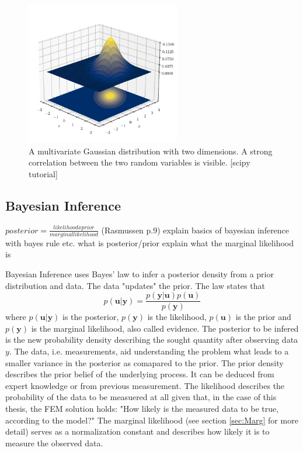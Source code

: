 \documentclass[%
  a4paper,oneside,%
  11pt,%
  smallchapters,
  green,%
  rgb, <cmyk>
  ]{tubsbook}
\begin{document}
\begin{figure}[h]
\begin{center}
\includegraphics[width=0.6\textwidth]{pics/Gaussians}
\caption{A multivariate Gaussian distribution with two dimensions. A strong correlation between the two random variables is visible. [scipy tutorial] }
\label{fig:MultiGauss}
\end{center}
\end{figure}

\subsection{Bayesian Inference}
$posterior = \frac{likelihood x prior}{marginal likelihood}$ (Rasmussen p.9)
explain basics of bayesian inference with bayes rule etc. what is posterior/prior 
explain what the marginal likelihood is

Bayesian Inference uses Bayes' law to infer a posterior density from a prior distribution and data. The data "updates" the prior. The law states that
\begin{equation}
p(\bm{u}|\bm{y}) = \frac{p(\bm{y}|\bm{u})p(\bm{u})}{p(\bm{y})}
\end{equation}
where $p(\bm{u}|\bm{y})$ is the posterior, $p(\bm{y})$ is the likelihood, $p(\bm{u})$ is the prior and $p(\bm{y})$ is the marginal likelihood, also called evidence. The posterior to be infered is the new probability density describing the sought quantity after observing data $y$. The data, i.e. measurements, aid understanding the problem what leads to a smaller variance in the posterior as comapared to the prior. The prior density describes the prior belief of the underlying process. It can be deduced from expert knowledge or from previous measurement. 
The likelihood describes the probability of the data to be measuered at all given that, in the case of this thesis, the FEM solution holds: "How likely is the measured data to be true, according to the model?"
The marginal likelihood (see section \ref{sec:Marg} for more detail) serves as a normalization constant and describes how likely it is to measure the observed data.
\end{document}
